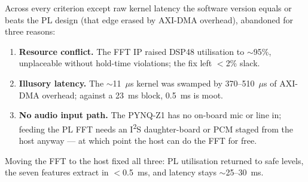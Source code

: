 Across every criterion except raw kernel latency the software version equals or
beats the PL design (that edge erased by AXI-DMA overhead), abandoned for three
reasons:

\begin{enumerate}
  \item \textbf{Resource conflict.} The FFT IP raised DSP48 utilisation to
  $\sim$95\%, unplaceable without hold-time violations; the fix left $<$2\% slack.
  \item \textbf{Illusory latency.} The $\sim$11~$\mu$s kernel was swamped by
  370--510~$\mu$s of AXI-DMA overhead; against a 23~ms block, 0.5~ms is moot.
  \item \textbf{No audio input path.} The PYNQ-Z1 has no on-board mic or line in;
  feeding the PL FFT needs an I\textsuperscript{2}S daughter-board or PCM staged
  from the host anyway --- at which point the host can do the FFT for free.
\end{enumerate}

Moving the FFT to the host fixed all three: PL utilisation returned to safe
levels, the seven features extract in $<$0.5~ms, and latency stays $\sim$25--30~ms.
